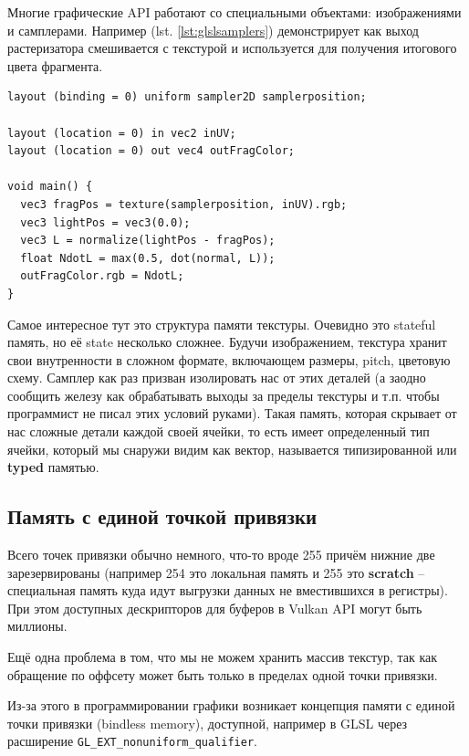 \documentclass[a4paper,12pt,oneside]{article}
\begin{document}
Многие графические API работают со специальными объектами: изображениями и самплерами. Например (lst. \ref{lst:glslsamplers}) демонстрирует как выход растеризатора смешивается с текстурой и используется для получения итогового цвета фрагмента.

\begin{lstlisting}[caption={Работа с typed памятью},label={lst:glslsamplers}]
layout (binding = 0) uniform sampler2D samplerposition;

layout (location = 0) in vec2 inUV;
layout (location = 0) out vec4 outFragColor;

void main() {
  vec3 fragPos = texture(samplerposition, inUV).rgb;
  vec3 lightPos = vec3(0.0);
  vec3 L = normalize(lightPos - fragPos);
  float NdotL = max(0.5, dot(normal, L));
  outFragColor.rgb = NdotL;
}
\end{lstlisting}

Самое интересное тут это структура памяти текстуры. Очевидно это stateful память, но её state несколько сложнее.
Будучи изображением, текстура хранит свои внутренности в сложном формате, включающем размеры, pitch, цветовую схему.
Самплер как раз призван изолировать нас от этих деталей (а заодно сообщить железу как обрабатывать выходы за пределы текстуры и т.п. чтобы программист не писал этих условий руками).
Такая память, которая скрывает от нас сложные детали каждой своей ячейки, то есть имеет определенный тип ячейки, который мы снаружи видим как вектор, называется типизированной или \textbf{typed} памятью.

\subsection{Память с единой точкой привязки}\label{subsec:bindless}

Всего точек привязки обычно немного, что-то вроде 255 причём нижние две зарезервированы (например 254 это локальная память и 255 это \textbf{scratch} -- специальная память куда идут выгрузки данных не вместившихся в регистры).
При этом доступных дескрипторов для буферов в Vulkan API могут быть миллионы.

Ещё одна проблема в том, что мы не можем хранить массив текстур, так как обращение по оффсету может быть только в пределах одной точки привязки.

Из-за этого в программировании графики возникает концепция памяти с единой точки привязки (bindless memory), доступной, например в GLSL через расширение \lstinline!GL_EXT_nonuniform_qualifier!.
\end{document}

